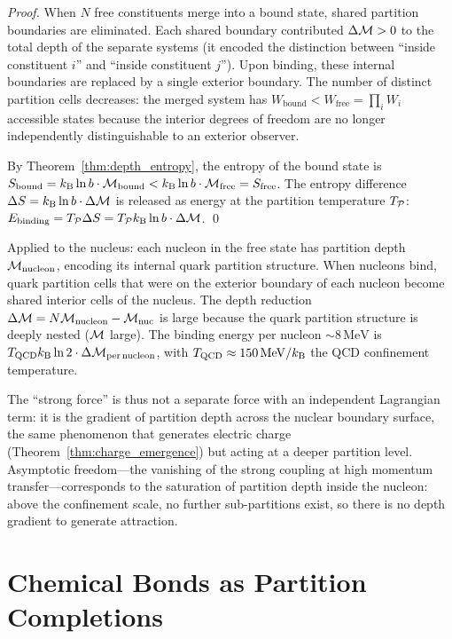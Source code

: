 \begin{proof}
When $N$ free constituents merge into a bound state, shared partition boundaries
are eliminated. Each shared boundary contributed $\Delta\mathcal{M} > 0$ to the
total depth of the separate systems (it encoded the distinction between
``inside constituent $i$'' and ``inside constituent $j$''). Upon binding,
these internal boundaries are replaced by a single exterior boundary.
The number of distinct partition cells decreases: the merged system has
$W_{\mathrm{bound}} < W_{\mathrm{free}} = \prod_i W_i$ accessible states
because the interior degrees of freedom are no longer independently distinguishable
to an exterior observer.

By Theorem~\ref{thm:depth_entropy}, the entropy of the bound state is
$S_{\mathrm{bound}} = k_{\mathrm{B}} \ln b \cdot \mathcal{M}_{\mathrm{bound}} < k_{\mathrm{B}} \ln b \cdot \mathcal{M}_{\mathrm{free}} = S_{\mathrm{free}}$.
The entropy difference $\Delta S = k_{\mathrm{B}} \ln b \cdot \Delta\mathcal{M}$ is released
as energy at the partition temperature $T_{\mathcal{P}}$:
$E_{\mathrm{binding}} = T_{\mathcal{P}} \Delta S = T_{\mathcal{P}} k_{\mathrm{B}} \ln b \cdot \Delta\mathcal{M}$. \qed
\end{proof}

Applied to the nucleus: each nucleon in the free state has partition depth
$\mathcal{M}_{\mathrm{nucleon}}$, encoding its internal quark partition structure.
When nucleons bind, quark partition cells that were on the exterior boundary
of each nucleon become shared interior cells of the nucleus. The depth
reduction $\Delta\mathcal{M} = N\mathcal{M}_{\mathrm{nucleon}} - \mathcal{M}_{\mathrm{nuc}}$
is large because the quark partition structure is deeply nested ($\mathcal{M}$ large).
The binding energy per nucleon $\sim 8\,\mathrm{MeV}$ is
$T_{\mathrm{QCD}} k_{\mathrm{B}} \ln 2 \cdot \Delta\mathcal{M}_{\mathrm{per\,nucleon}}$, with
$T_{\mathrm{QCD}} \approx 150\,\mathrm{MeV}/k_{\mathrm{B}}$ the QCD confinement temperature.

The ``strong force'' is thus not a separate force with an independent Lagrangian
term: it is the gradient of partition depth across the nuclear boundary surface,
the same phenomenon that generates electric charge (Theorem~\ref{thm:charge_emergence})
but acting at a deeper partition level. Asymptotic freedom---the vanishing of
the strong coupling at high momentum transfer---corresponds to the saturation
of partition depth inside the nucleon: above the confinement scale, no further
sub-partitions exist, so there is no depth gradient to generate attraction.

\section{Chemical Bonds as Partition Completions}
\label{sec:chemical_bonds}

